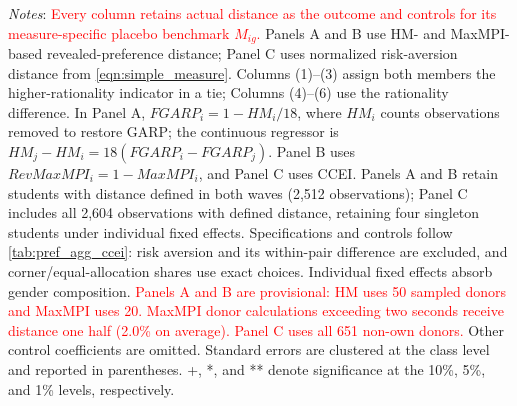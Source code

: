 \documentclass[11 pt]{article}
\renewcommand{\arraystretch}{1.2} %
\begin{document}
\begin{table}[H]
\centering
\singlespacing
\caption{Alternative Measures of Rationality and Preference Distance \mbox{(Updated)}}
\label{tab:pref_agg_alternatives}
\label{tab:pref_agg_hm}
\label{tab:pref_agg_maxmpi}
\label{tab:pref_agg_ra_index}
\footnotesize
\setlength{\tabcolsep}{3pt}
\renewcommand{\arraystretch}{1.0}
\begin{minipage}{\textwidth}
\footnotesize
\emph{Notes}: \textcolor{red}{Every column retains actual distance as the outcome and controls for its measure-specific placebo benchmark $M_{ig}$.}  Panels A and B use HM- and MaxMPI-based revealed-preference distance; Panel C uses normalized risk-aversion distance from \eqref{eqn:simple_measure}. Columns (1)--(3) assign both members the higher-rationality indicator in a tie; Columns (4)--(6) use the rationality difference. In Panel A, $FGARP_i=1-HM_i/18$, where $HM_i$ counts observations removed to restore GARP; the continuous regressor is $HM_j-HM_i=18(FGARP_i-FGARP_j)$. Panel B uses $RevMaxMPI_i=1-MaxMPI_i$, and Panel C uses CCEI. Panels A and B retain students with distance defined in both waves (2,512 observations); Panel C includes all 2,604 observations with defined distance, retaining four singleton students under individual fixed effects. Specifications and controls follow \autoref{tab:pref_agg_ccei}: risk aversion and its within-pair difference are excluded, and corner/equal-allocation shares use exact choices. Individual fixed effects absorb gender composition. \textcolor{red}{Panels A and B are provisional: HM uses 50 sampled donors and MaxMPI uses 20. MaxMPI donor calculations exceeding two seconds receive distance one half (2.0\% on average). Panel C uses all 651 non-own donors.} Other control coefficients are omitted. Standard errors are clustered at the class level and reported in parentheses. +, *, and ** denote significance at the 10\%, 5\%, and 1\% levels, respectively.
\end{minipage}
\end{table}
\end{document}
